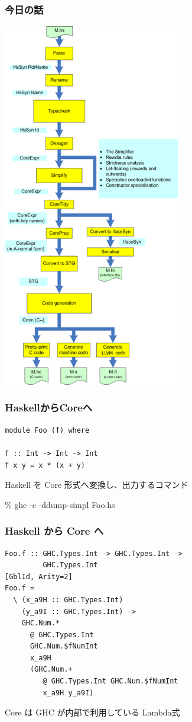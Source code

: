 \documentclass[cjk,dvipdfm,14pt]{beamer}
\begin{document}
\begin{frame}[fragile]
\frametitle{今日の話}

\includegraphics[height=16cm]{./hscpipe2.png}

\end{frame}

\begin{frame}[fragile]
\frametitle{HaskellからCoreへ}

\begin{lstlisting}
module Foo (f) where

f :: Int -> Int -> Int
f x y = x * (x + y)
\end{lstlisting}

\hrulefill

Haskell を Core 形式へ変換し、出力するコマンド

\% ghc -c -ddump-simpl Foo.hs

\end{frame}

\begin{frame}[fragile]
\frametitle{Haskell から Core へ}

\begin{lstlisting}
Foo.f :: GHC.Types.Int -> GHC.Types.Int ->
         GHC.Types.Int
[GblId, Arity=2]
Foo.f =
  \ (x_a9H :: GHC.Types.Int)
    (y_a9I :: GHC.Types.Int) ->
    GHC.Num.*
      @ GHC.Types.Int
      GHC.Num.$fNumInt
      x_a9H
      (GHC.Num.+
         @ GHC.Types.Int GHC.Num.$fNumInt
         x_a9H y_a9I)

\end{lstlisting}

\hrulefill

Core は GHC が内部で利用している Lambda式

\end{frame}
\end{document}
